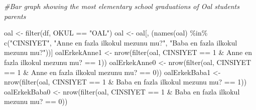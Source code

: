 \documentclass[
]{article}
\newenvironment{Shaded}{\begin{snugshade}}{\end{snugshade}}
\newcommand{\AttributeTok}[1]{\textcolor[rgb]{0.77,0.63,0.00}{#1}}
\newcommand{\CommentTok}[1]{\textcolor[rgb]{0.56,0.35,0.01}{\textit{#1}}}
\newcommand{\DecValTok}[1]{\textcolor[rgb]{0.00,0.00,0.81}{#1}}
\newcommand{\FunctionTok}[1]{\textcolor[rgb]{0.00,0.00,0.00}{#1}}
\newcommand{\NormalTok}[1]{#1}
\newcommand{\OtherTok}[1]{\textcolor[rgb]{0.56,0.35,0.01}{#1}}
\newcommand{\SpecialCharTok}[1]{\textcolor[rgb]{0.00,0.00,0.00}{#1}}
\newcommand{\StringTok}[1]{\textcolor[rgb]{0.31,0.60,0.02}{#1}}
\begin{document}
\begin{Shaded}
\begin{Highlighting}[]
\CommentTok{\#Bar graph showing the most elementary school graduations of Oal students\textquotesingle{} parents}

\NormalTok{oal }\OtherTok{\textless{}{-}} \FunctionTok{filter}\NormalTok{(df, OKUL }\SpecialCharTok{==} \StringTok{"OAL"}\NormalTok{)}
\NormalTok{oal }\OtherTok{\textless{}{-}}\NormalTok{ oal[, (}\FunctionTok{names}\NormalTok{(oal) }\SpecialCharTok{\%in\%} \FunctionTok{c}\NormalTok{(}\StringTok{"CINSIYET"}\NormalTok{, }\StringTok{"Anne en fazla ilkokul mezunu mu?"}\NormalTok{, }\StringTok{"Baba en fazla ilkokul mezunu mu?"}\NormalTok{))]}
\NormalTok{oalErkekAnne1 }\OtherTok{\textless{}{-}} \FunctionTok{nrow}\NormalTok{(}\FunctionTok{filter}\NormalTok{(oal, CINSIYET }\SpecialCharTok{==} \DecValTok{1} \SpecialCharTok{\&} \StringTok{\textasciigrave{}}\AttributeTok{Anne en fazla ilkokul mezunu mu?}\StringTok{\textasciigrave{}} \SpecialCharTok{==} \DecValTok{1}\NormalTok{))}
\NormalTok{oalErkekAnne0 }\OtherTok{\textless{}{-}} \FunctionTok{nrow}\NormalTok{(}\FunctionTok{filter}\NormalTok{(oal, CINSIYET }\SpecialCharTok{==} \DecValTok{1} \SpecialCharTok{\&} \StringTok{\textasciigrave{}}\AttributeTok{Anne en fazla ilkokul mezunu mu?}\StringTok{\textasciigrave{}} \SpecialCharTok{==} \DecValTok{0}\NormalTok{))}
\NormalTok{oalErkekBaba1 }\OtherTok{\textless{}{-}} \FunctionTok{nrow}\NormalTok{(}\FunctionTok{filter}\NormalTok{(oal, CINSIYET }\SpecialCharTok{==} \DecValTok{1} \SpecialCharTok{\&} \StringTok{\textasciigrave{}}\AttributeTok{Baba en fazla ilkokul mezunu mu?}\StringTok{\textasciigrave{}} \SpecialCharTok{==} \DecValTok{1}\NormalTok{))}
\NormalTok{oalErkekBaba0 }\OtherTok{\textless{}{-}} \FunctionTok{nrow}\NormalTok{(}\FunctionTok{filter}\NormalTok{(oal, CINSIYET }\SpecialCharTok{==} \DecValTok{1} \SpecialCharTok{\&} \StringTok{\textasciigrave{}}\AttributeTok{Baba en fazla ilkokul mezunu mu?}\StringTok{\textasciigrave{}} \SpecialCharTok{==} \DecValTok{0}\NormalTok{))}


\end{Highlighting}
\end{Shaded}
\end{document}
